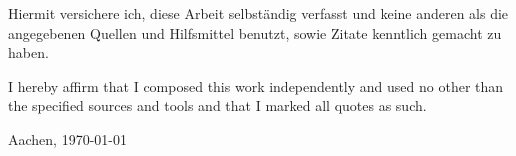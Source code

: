 \mbox{}
\vfill
Hiermit versichere ich, diese Arbeit selbständig verfasst und keine anderen als die angegebenen Quellen und
Hilfsmittel benutzt, sowie Zitate kenntlich gemacht zu haben.
\bigskip

I hereby affirm that I composed this work independently and used no other than the specified sources and tools and
that I marked all quotes as such.
\medskip

\begin{flushright}
Aachen, \today

\vspace{1.5cm}
\small
\makeatletter\@thesisAuthor\makeatother\par
\end{flushright}
\vfill
\eject
